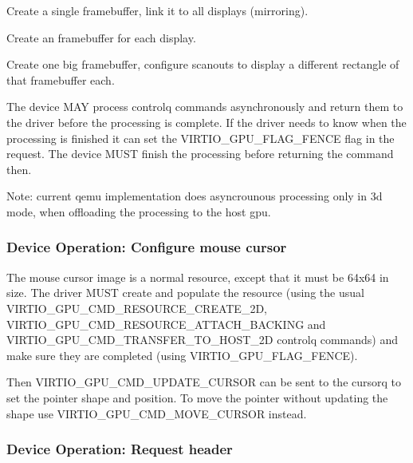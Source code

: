 \begin{itemize*}
\item Create a single framebuffer, link it to all displays
  (mirroring).
\item Create an framebuffer for each display.
\item Create one big framebuffer, configure scanouts to display a
  different rectangle of that framebuffer each.
\end{itemize*}


The device MAY process controlq commands asynchronously and return them
to the driver before the processing is complete.  If the driver needs
to know when the processing is finished it can set the
VIRTIO_GPU_FLAG_FENCE flag in the request.  The device MUST finish the
processing before returning the command then.

Note: current qemu implementation does asyncrounous processing only in
3d mode, when offloading the processing to the host gpu.

\subsubsection{Device Operation: Configure mouse cursor}

The mouse cursor image is a normal resource, except that it must be
64x64 in size.  The driver MUST create and populate the resource
(using the usual VIRTIO_GPU_CMD_RESOURCE_CREATE_2D,
VIRTIO_GPU_CMD_RESOURCE_ATTACH_BACKING and
VIRTIO_GPU_CMD_TRANSFER_TO_HOST_2D controlq commands) and make sure they
are completed (using VIRTIO_GPU_FLAG_FENCE).

Then VIRTIO_GPU_CMD_UPDATE_CURSOR can be sent to the cursorq to set
the pointer shape and position.  To move the pointer without updating
the shape use VIRTIO_GPU_CMD_MOVE_CURSOR instead.

\subsubsection{Device Operation: Request header}\label{sec:Device Types / GPU Device / Device Operation / Device Operation: Request header}

